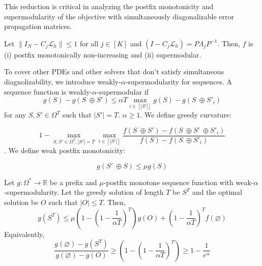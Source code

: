 \documentclass[12pt]{article}
\begin{document}
This reduction is critical in analyzing the postfix monotonicity and supermodularity of the objective with simultaneously diagonalizable error propagation matrices.

\begin{proposition} \label{th:simultaneous}
    Let $\|I_N - C_j\mathcal{L}_h\| \leq 1$ for all $j \in [K]$ and $\left(I - C_j \mathcal{L}_{h}\right) = P\Lambda_jP^{-1}$. Then, $f$ is (i) postfix monotonically non-increasing and (ii) supermodular. 
\end{proposition}

To cover other PDEs and other solvers that don't satisfy simultaneous diagnolizability, we introduce weakly-$\alpha$-supermodularity for sequences. A sequence function is weakly-$\alpha$-supermodular if 
\begin{equation*}
     g(S) - g(S\ \oplus S') \leq \alpha T \max_{i \in [|S'|]} g(S) - g(S \ \oplus S'_i)
\end{equation*}
for any $S, S' \in \Omega^T$ such that $|S'| = T$. $\alpha \geq 1$. We define greedy curvature:

\begin{equation*}
    1 - \max_{S, S' \in \Omega^T, |S'| = T}\max_{i \in [|S'|]}\frac{f(S \ \oplus S') - f(S \ \oplus  S' \ \oplus S'_i)}{f(S) - f(S \ \oplus S'_i)}
\end{equation*}. We define weak postfix monotonicity:

\begin{equation*}
    g(S' \ \oplus S) \leq \mu g(S)
\end{equation*}

\begin{theorem} \label{th:suboptgreedy2}
    Let $g: \Omega^* \to \mathbb{R}$ be a prefix and $\mu$-postfix monotone sequence function with weak-$\alpha$-supermodularity. Let the greedy solution of length $T$ be $S^T$ and the optimal solution be $O$ such that $|O| \leq T$. Then,
    \begin{equation*}
        g(S^T) \leq \mu \left(1 - \left(1 - \frac{1}{\alpha T}\right)^T\right)
        g(O) +  \left(1 - \frac{1}{\alpha T}\right)^Tf(\varnothing)
    \end{equation*}
    Equivalently, 
    \begin{equation*}
        \frac{g(\varnothing) - g(S^T)}{g(\varnothing) - g(O)} \geq \left(1 - \left(1 - \frac{1}{\alpha T}\right)^T\right) \geq 1 - \frac{1}{e^{\alpha}}
    \end{equation*}
\end{theorem}
\end{document}
